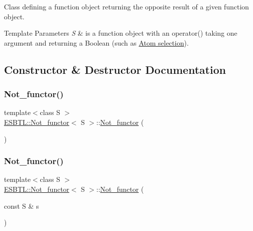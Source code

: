 Class defining a function object returning the opposite result of a given function object. 
\begin{DoxyTemplParams}{Template Parameters}
{\em S} & is a function object with an operator() taking one argument and returning a Boolean (such as \hyperlink{group__atomsel}{Atom selection}). \\
\hline
\end{DoxyTemplParams}


\subsection{Constructor \& Destructor Documentation}
\mbox{\label{structESBTL_1_1Not__functor_a33d2670f7406276a8690e65bd1e5a6f7}} 
\subsubsection{\texorpdfstring{Not\+\_\+functor()}{Not\_functor()}\hspace{0.1cm}{\footnotesize\ttfamily [1/2]}}
{\footnotesize\ttfamily template$<$class S $>$ \\
\hyperlink{structESBTL_1_1Not__functor}{E\+S\+B\+T\+L\+::\+Not\+\_\+functor}$<$ S $>$\+::\hyperlink{structESBTL_1_1Not__functor}{Not\+\_\+functor} (\begin{DoxyParamCaption}{ }\end{DoxyParamCaption})\hspace{0.3cm}{\ttfamily [inline]}}

\mbox{\label{structESBTL_1_1Not__functor_aab72e39a6e57edad9f2c15e59ec34836}} 
\subsubsection{\texorpdfstring{Not\+\_\+functor()}{Not\_functor()}\hspace{0.1cm}{\footnotesize\ttfamily [2/2]}}
{\footnotesize\ttfamily template$<$class S $>$ \\
\hyperlink{structESBTL_1_1Not__functor}{E\+S\+B\+T\+L\+::\+Not\+\_\+functor}$<$ S $>$\+::\hyperlink{structESBTL_1_1Not__functor}{Not\+\_\+functor} (\begin{DoxyParamCaption}\item[{const S \&}]{s }\end{DoxyParamCaption})\hspace{0.3cm}{\ttfamily [inline]}}



